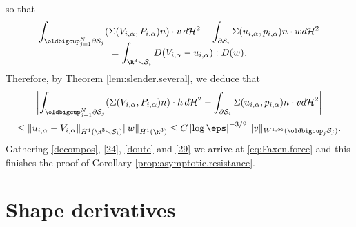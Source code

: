 so that
\begin{multline*}
\int_{\oldbigcup_{j=1}^N \partial \mathcal S_j} (\Sigma (V_{i,\alpha}, P_{i,\alpha}) n) \cdot v \, d\mathcal{H}^2
- \int_{\partial \mathcal S_i} \Sigma (u_{i,\alpha}, p_{i,\alpha}) n \cdot w {d\mathcal{H}^2}
\\[-8pt]
=\int_{\R^3 \smallsetminus \mathcal S_i } D(V_{i,\alpha} - u_{i,\alpha}) : D(w).
\end{multline*}
Therefore, by Theorem \ref{lem:slender.several}, we deduce that
\begin{multline}\label{29}
\biggl| \int_{\oldbigcup_{j=1}^N \partial \mathcal S_j} (\Sigma (V_{i,\alpha}, P_{i,\alpha}) n) \cdot h \, d\mathcal{H}^2
- \int_{\partial \mathcal S_i} \Sigma (u_{i,\alpha}, p_{i,\alpha}) n \cdot v {d\mathcal{H}^2}
\biggr| \\
\leq
\| u_{i,\alpha} - V_{i,\alpha}\|_{\dot H^1(\R^3 \smallsetminus \mathcal S_i)} \|w\|_{\dot H^1(\R^3)}
\leq C \left|\log \eps\right|^{-3/2} \|v\|_{W^{1,\infty}{(\oldbigcup_{j}\mathcal S_j)}}.
\end{multline}
Gathering
\eqref{decompos}, \eqref{24},
\eqref{doute}
and \eqref{29} we arrive at
\eqref{eq:Faxen.force} and
this finishes the proof of Corollary \ref{prop:asymptotic.resistance}.

\section{Shape derivatives}
\label{shape-derivative}

